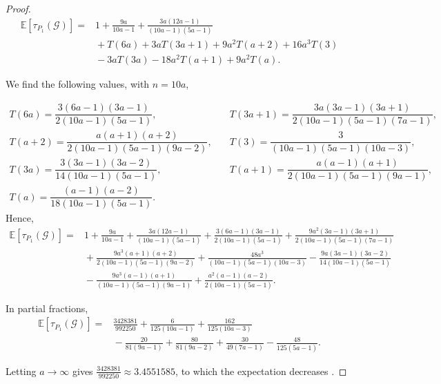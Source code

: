 \documentclass{article}
\newcommand{\Gscr}{\mathscr{G}}
\newcommand{\E}{\mathbb{E}}
\begin{document}
\begin{proof}
\[
\begin{aligned}
\E[\tau_{P_1}(\Gscr)]
={}&1+\frac{9a}{10a-1}
+\frac{3a(12a-1)}{(10a-1)(5a-1)}\\
&{}+T(6a)
+3aT(3a+1)
+9a^2T(a+2)
+16a^3T(3)\\
&{}-3aT(3a)
-18a^2T(a+1)
+9a^2T(a).
\end{aligned}
\]

We find the following values, with $n=10a$,


\[
\begin{array}{ll}
T(6a)=\dfrac{3(6a-1)(3a-1)}{2(10a-1)(5a-1)},
   & \quad
T(3a+1)=\dfrac{3a(3a-1)(3a+1)}{2(10a-1)(5a-1)(7a-1)},\\[2ex]
T(a+2)=\dfrac{a(a+1)(a+2)}{2(10a-1)(5a-1)(9a-2)},
   & \quad
T(3)=\dfrac{3}{(10a-1)(5a-1)(10a-3)},\\[2ex]
T(3a)=\dfrac{3(3a-1)(3a-2)}{14(10a-1)(5a-1)},
   & \quad
T(a+1)=\dfrac{a(a-1)(a+1)}{2(10a-1)(5a-1)(9a-1)},\\[2ex]
T(a)=\dfrac{(a-1)(a-2)}{18(10a-1)(5a-1)}.
   &
\end{array}
\]
Hence, 
\[
\begin{aligned}
\E[\tau_{P_1}(\Gscr)]
={}&1+\frac{9a}{10a-1}
+\frac{3a(12a-1)}{(10a-1)(5a-1)}
+\frac{3(6a-1)(3a-1)}
{2(10a-1)(5a-1)}+\frac{9a^2(3a-1)(3a+1)}
{2(10a-1)(5a-1)(7a-1)}\\
&{}+\frac{9a^3(a+1)(a+2)}
{2(10a-1)(5a-1)(9a-2)}+\frac{48a^3}
{(10a-1)(5a-1)(10a-3)}-\frac{9a(3a-1)(3a-2)}
{14(10a-1)(5a-1)}\\
&{}-\frac{9a^3(a-1)(a+1)}
{(10a-1)(5a-1)(9a-1)}+\frac{a^2(a-1)(a-2)}
{2(10a-1)(5a-1)}.
\end{aligned}
\]

In partial fractions,
\[
\begin{aligned}
\E[\tau_{P_1}(\Gscr)]
={}&
\frac{3428381}{992250}
+\frac{6}{125(10a-1)}
+\frac{162}{125(10a-3)}\\
&{}-\frac{20}{81(9a-1)}
+\frac{80}{81(9a-2)}
+\frac{30}{49(7a-1)}
-\frac{48}{125(5a-1)}.
\end{aligned}
\]


Letting $a\to\infty$ gives
$\tfrac{3428381}{992250}\approx3.4551585$, to which the expectation decreases .
\end{proof}
\end{document}
